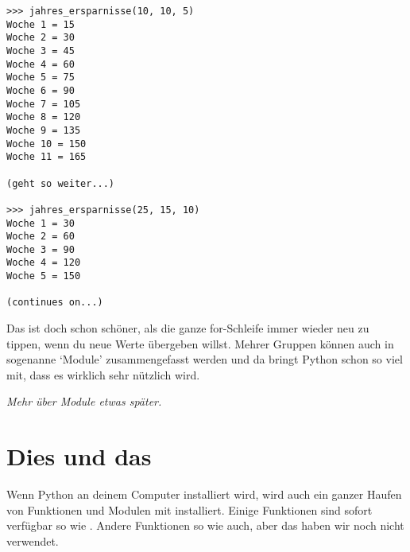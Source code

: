 


\begin{Verbatim}[frame=single, label=Ausgabe]
>>> jahres_ersparnisse(10, 10, 5)
Woche 1 = 15
Woche 2 = 30
Woche 3 = 45
Woche 4 = 60
Woche 5 = 75
Woche 6 = 90
Woche 7 = 105
Woche 8 = 120
Woche 9 = 135
Woche 10 = 150
Woche 11 = 165

(geht so weiter...)

>>> jahres_ersparnisse(25, 15, 10)
Woche 1 = 30
Woche 2 = 60
Woche 3 = 90
Woche 4 = 120
Woche 5 = 150

(continues on...)
\end{Verbatim}

Das ist doch schon schöner, als die ganze for-Schleife immer wieder neu zu tippen, wenn du neue Werte übergeben willst. Mehrer Gruppen können auch in sogenanne `Module' zusammengefasst werden und da bringt Python schon so viel mit, dass es wirklich sehr nützlich wird.
\par
\noindent
\emph{Mehr über Module etwas später.}

\section{Dies und das} 

Wenn Python an deinem Computer installiert wird, wird auch ein ganzer Haufen von Funktionen und Modulen mit installiert. Einige Funktionen sind sofort verfügbar so wie . Andere Funktionen so wie  auch, aber das haben wir noch nicht verwendet.

